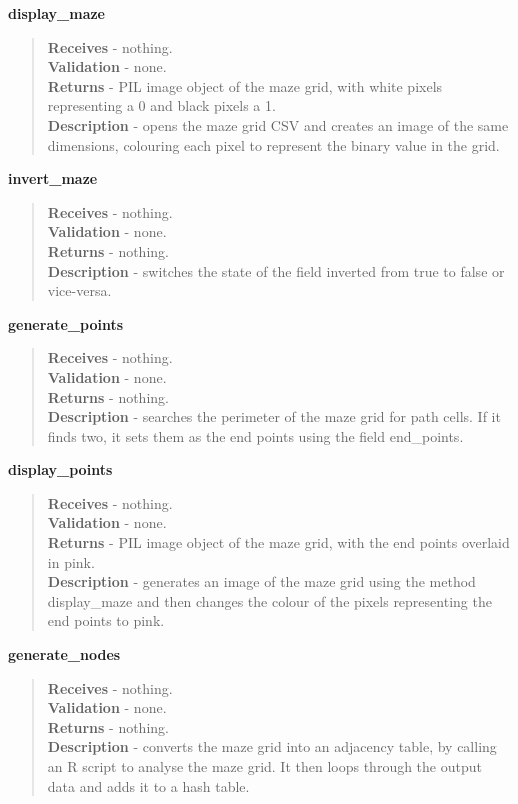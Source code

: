 \documentclass[titlepage]{article}
\begin{document}
\textbf{display\_maze}
\begin{quote}
\textbf{Receives} - nothing.
\\
\textbf{Validation} - none.\\
\textbf{Returns} - PIL image object of the maze grid, with white pixels representing a 0 and black pixels a 1.
\\
\textbf{Description} - opens the maze grid CSV and creates an image of the same dimensions, colouring each pixel to represent the binary value in the grid.
\end{quote}

\textbf{invert\_maze}
\begin{quote}
\textbf{Receives} - nothing.
\\
\textbf{Validation} - none.\\
\textbf{Returns} - nothing.
\\
\textbf{Description} - switches the state of the field inverted from true to false or vice-versa.
\end{quote}

\textbf{generate\_points}
\begin{quote}
\textbf{Receives} - nothing.
\\
\textbf{Validation} - none.\\
\textbf{Returns} - nothing.
\\
\textbf{Description} - searches the perimeter of the maze grid for path cells. If it finds two, it sets them as the end points using the field end\_points.
\end{quote}

\textbf{display\_points}
\begin{quote}
\textbf{Receives} - nothing.
\\
\textbf{Validation} - none.\\
\textbf{Returns} - PIL image object of the maze grid, with the end points overlaid in pink.
\\
\textbf{Description} - generates an image of the maze grid using the method display\_maze and then changes the colour of the pixels representing the end points to pink. 
\end{quote}

\textbf{generate\_nodes}
\begin{quote}
\textbf{Receives} - nothing.
\\
\textbf{Validation} - none.\\
\textbf{Returns} - nothing.
\\
\textbf{Description} - converts the maze grid into an adjacency table, by calling an R script to analyse the maze grid. It then loops through the output data and adds it to a hash table.
\end{quote}
\end{document}
